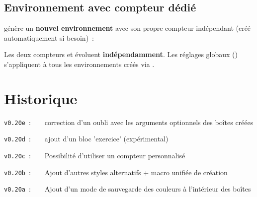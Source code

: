 \documentclass[french,11pt,a4paper]{article}
\begin{document}
\subsection{Environnement avec compteur dédié}

 génère un \textbf{nouvel environnement} avec son propre compteur indépendant (créé automatiquement si besoin)~:

\begin{codehigh}[language=latex/latex2,style/main=cyan!10,style/code=cyan!10]
\end{codehigh}

\begin{demohigh}[language=latex/latex2,style/main=cyan!10,style/code=cyan!10]

\begin{exoTD}[niveau=1]
\lipsum[1][1-2]
\end{exoTD}

\begin{exoAppro}[niveau=4,type=python]
\lipsum[1][1-2]
\end{exoAppro}

\begin{exoTD}[niveau=2,type=qcm]
\lipsum[1][1-2]
\end{exoTD}
\end{demohigh}

Les deux compteurs  et  évoluent
\textbf{indépendamment}. Les réglages globaux ()
s'appliquent à tous les environnements créés via .

\pagebreak

\section{Historique}

\verb|v0.20e|~:~~~~correction d'un oubli avec les arguments optionnels des boîtes créées

\verb|v0.20d|~:~~~~ajout d'un bloc 'exercice' (expérimental)

\verb|v0.20c|~:~~~~Possibilité d'utiliser un compteur personnalisé

\verb|v0.20b|~:~~~~Ajout d'autres styles alternatifs + macro unifiée de création

\verb|v0.20a|~:~~~~Ajout d'un mode de sauvegarde des couleurs à l'intérieur des boîtes
\end{document}
